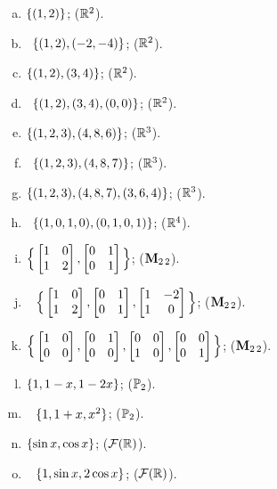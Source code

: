 \begin{prob}
\begin{enumerate}[(a)]
\medskip
\item  $\{(1,2)\} $; ($\mathbb{R}^2$). \medskip
\item\sov~$\{(1,2), (-2,-4)\} $; ($\mathbb{R}^2$).\medskip

\item $\{(1,2), (3,4)\} $; ($\mathbb{R}^2$).\medskip

\item\sov~$\{(1,2), (3,4), (0,0)\} $; ($\mathbb{R}^2$).\medskip

\item  $\{(1,2,3), (4,8,6)\}$; ($\mathbb{R}^3$). \medskip


\item\sov~$\{(1,2,3), (4,8,7)\}$; ($\mathbb{R}^3$).\medskip


\item $\{(1,2,3), (4,8,7), (3,6,4)\}$; ($\mathbb{R}^3$).\medskip

\item\sov~$\{(1,0,1,0), (0,1,0,1)\}$; ($\mathbb{R}^4$).\medskip


\item  $\Big\{\bmatrix 1&0\\1&2\endbmatrix, \bmatrix 0&1\\0&1\endbmatrix \Big\}$; ($\mathbf{M}_{2 \,2}$).\medskip


\item\sov~ $\Big\{\bmatrix 1&0\\1&2\endbmatrix, \bmatrix 0&1\\0&1\endbmatrix , \bmatrix 1&-2\\1&0\endbmatrix \Big\}$; ($\mathbf{M}_{2 \,2}$).\medskip


\item  $\Big\{\bmatrix 1&0\\0&0\endbmatrix, \bmatrix 0&1\\0&0\endbmatrix,\bmatrix 0&0\\1&0\endbmatrix,\bmatrix 0&0\\0&1\endbmatrix \Big\}$; ($\mathbf{M}_{2 \,2}$).\medskip

 
\item  $\{1, 1-x, 1-2x\}$; ($\mathbb{P}_2$). \medskip

\item\sov~ $\{1, 1+x, x^2\}$; ($\mathbb{P}_2$). \medskip 

\item  $\{ \sin x,  \cos x\}$; ($\mathcal{F}(\mathbb{R})$). \medskip  

\item\sov~ $\{1, \sin x, 2 \cos x\}$; ($\mathcal{F}(\mathbb{R})$). \medskip  


\end{enumerate}
\end{prob}
